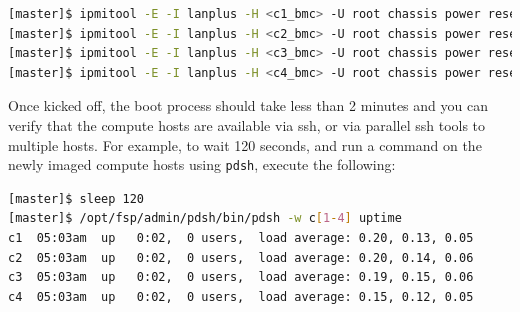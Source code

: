 \documentclass[letterpaper]{article}
\begin{document}

\begin{lstlisting}[language=bash,keywords={},upquote=true]
[master]$ ipmitool -E -I lanplus -H <c1_bmc> -U root chassis power reset   # power cycle c1
[master]$ ipmitool -E -I lanplus -H <c2_bmc> -U root chassis power reset   # power cycle c2
[master]$ ipmitool -E -I lanplus -H <c3_bmc> -U root chassis power reset   # power cycle c3
[master]$ ipmitool -E -I lanplus -H <c4_bmc> -U root chassis power reset   # power cycle c4
\end{lstlisting} 




Once kicked off, the boot process should take less than 2 minutes and you can
verify that the compute hosts are available via ssh, or via parallel ssh tools to multiple
hosts. For example, to wait 120 seconds, and run a command on the newly imaged
compute hosts using \texttt{pdsh}, execute the following:

\begin{lstlisting}[language=bash]
[master]$ sleep 120
[master]$ /opt/fsp/admin/pdsh/bin/pdsh -w c[1-4] uptime
c1  05:03am  up   0:02,  0 users,  load average: 0.20, 0.13, 0.05
c2  05:03am  up   0:02,  0 users,  load average: 0.20, 0.14, 0.06
c3  05:03am  up   0:02,  0 users,  load average: 0.19, 0.15, 0.06
c4  05:03am  up   0:02,  0 users,  load average: 0.15, 0.12, 0.05
\end{lstlisting}
\end{document}
